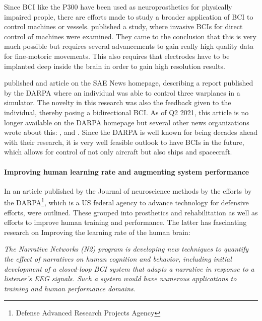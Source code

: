                 Since BCI like the P300 have been used as neuroprosthetics for physically impaired people, there are efforts made to study a broader application of BCI to control machines or vessels. \cite[]{Choi.2018} published a study, where  invasive BCIs for direct control of machines were examined. They came to the conclusion that this is very much possible but requires several advancements to gain really high quality data for fine-motoric movements. This also requires that electrodes have to be implanted deep inside the brain in order to gain high resolution results.

                \cite[]{WilliamKucinski.2018} published and article on the SAE News homepage, describing a report published by the DARPA where an individual was able to control three warplanes in a simulator. The novelty in this research was also the feedback given to the individual, thereby posing a bidirectional BCI. As of Q2 2021, this article is no longer available on the DARPA homepage but several other news organizations wrote about this: \cite[]{Stockton.03052015}, \cite[]{Blair.2018} and \cite[]{Tucker.09062018}. Since the DARPA is well known for being decades ahead with their research, it is very well feasible outlook to have BCIs in the future, which allows for control of not only aircraft but also ships and spacecraft.

            \paragraph{Improving human learning rate and augmenting system performance}

                In an article published by the Journal of neuroscience methods by \cite[]{Miranda.2015} the efforts by the DARPA\footnote{Defense Advanced Research Projects Agency}, which is a US federal agency to advance technology for defensive efforts, were outlined. These grouped into prosthetics and rehabilitation as well as efforts to improve human training and performance. The latter has fascinating research on Improving the learning rate of the human brain:

                \medskip
                \emph{The Narrative Networks (N2) program is developing new techniques to quantify the effect of narratives on human cognition and behavior, including initial development of a closed-loop BCI system that adapts a narrative in response to a listener's EEG signals. Such a system would have numerous applications to training and human performance domains.}\cite[]{Miranda.2015}
                \medskip

